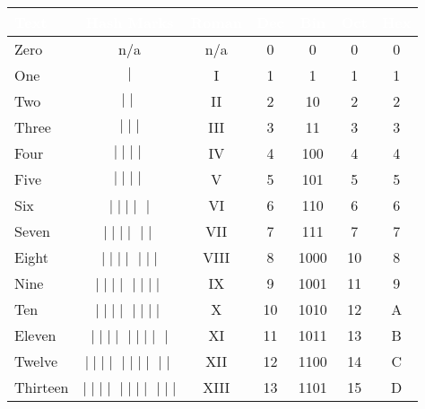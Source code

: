 \begin{table}[H]
  \sffamily
  \newcommand{\head}[1]{\textcolor{white}{\textbf{#1}}}
  \begin{center}
    \begin{tabular}{lcccccc} 
      \hline
      \rowcolor{black!75}
      \head{Text} & \head{Hash Marks} & \head{Roman} & \head{Dec} & \head{Bin} 
      & \head{Oct} & \head{Hex} \\ 
      \hline
      Zero      & n/a                           & n/a   & 0  & 0     & 0  & 0 \\ 
      One       & $\mid$                        & I     & 1  & 1     & 1  & 1 \\ 
      Two       & $\mid\mid$                    & II    & 2  & 10    & 2  & 2 \\ 
      Three     & $\mid\mid\mid$                & III   & 3  & 11    & 3  & 3 \\ 
      Four      & $\mid\mid\mid\mid$            & IV    & 4  & 100   & 4  & 4 \\ 
      Five      & \sout{$\mid\mid\mid\mid$} & V     & 5  & 101   & 5  & 5 \\ 
      Six       & \sout{$\mid\mid\mid\mid$}
      $\mid$                                    & VI    & 6  & 110   & 6  & 6 \\ 
      Seven     & \sout{$\mid\mid\mid\mid$}
      $\mid\mid$                                & VII   & 7  & 111   & 7  & 7 \\ 
      Eight     & \sout{$\mid\mid\mid\mid$}
      $\mid\mid\mid$                            & VIII  & 8  & 1000  & 10 & 8 \\ 
      Nine      & \sout{$\mid\mid\mid\mid$}
      $\mid\mid\mid\mid$                        & IX    & 9  & 1001  & 11 & 9 \\ 
      Ten       & \sout{$\mid\mid\mid\mid$}
      \sout{$\mid\mid\mid\mid$}             & X     & 10 & 1010  & 12 & A \\ 
      Eleven    & \sout{$\mid\mid\mid\mid$}
      \sout{$\mid\mid\mid\mid$}
      $\mid$                                    & XI    & 11 & 1011  & 13 & B \\ 
      Twelve    & \sout{$\mid\mid\mid\mid$}
      \sout{$\mid\mid\mid\mid$}
      $\mid\mid$                                & XII   & 12 & 1100  & 14 & C \\ 
      Thirteen  & \sout{$\mid\mid\mid\mid$}
      \sout{$\mid\mid\mid\mid$}
      $\mid\mid\mid$                            & XIII  & 13 & 1101  & 15 & D \\ 

\end{tabular}
\end{center}
\end{table}
